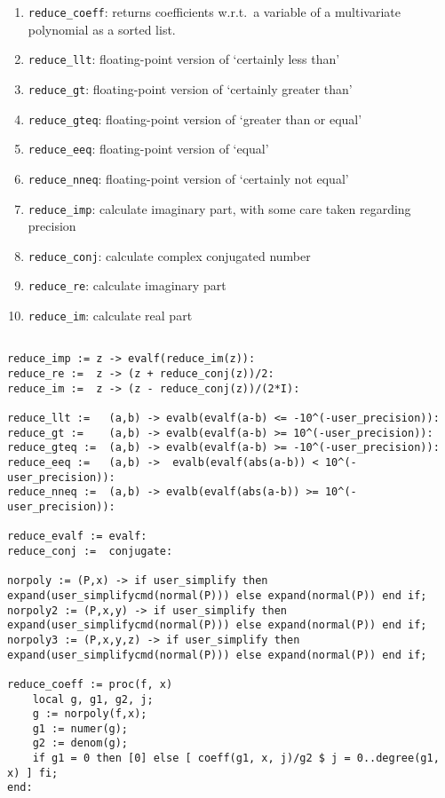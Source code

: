 \documentclass[a4paper,10pt]{article}
\begin{document}
\begin{enumerate}
\item   \verb+reduce_coeff+: returns coefficients w.r.t.~a variable of a multivariate polynomial as a sorted list.
\item   \verb+reduce_llt+: floating-point version of `certainly less than'
\item   \verb+reduce_gt+: floating-point version of `certainly greater than'
\item   \verb+reduce_gteq+: floating-point version of `greater than or equal'
\item   \verb+reduce_eeq+: floating-point version of `equal'
\item   \verb+reduce_nneq+: floating-point version of `certainly not equal'
\item   \verb+reduce_imp+: calculate imaginary part, with some care taken regarding precision
\item   \verb+reduce_conj+: calculate complex conjugated number
\item   \verb+reduce_re+: calculate imaginary part
\item   \verb+reduce_im+: calculate real part
\end{enumerate}

\begin{lstlisting}[name=tools]

reduce_imp := z -> evalf(reduce_im(z)):
reduce_re :=  z -> (z + reduce_conj(z))/2:
reduce_im :=  z -> (z - reduce_conj(z))/(2*I):

reduce_llt :=   (a,b) -> evalb(evalf(a-b) <= -10^(-user_precision)):
reduce_gt :=    (a,b) -> evalb(evalf(a-b) >= 10^(-user_precision)):
reduce_gteq :=  (a,b) -> evalb(evalf(a-b) >= -10^(-user_precision)):
reduce_eeq :=   (a,b) ->  evalb(evalf(abs(a-b)) < 10^(-user_precision)):
reduce_nneq :=  (a,b) -> evalb(evalf(abs(a-b)) >= 10^(-user_precision)):

reduce_evalf := evalf:
reduce_conj :=  conjugate:

norpoly := (P,x) -> if user_simplify then expand(user_simplifycmd(normal(P))) else expand(normal(P)) end if;
norpoly2 := (P,x,y) -> if user_simplify then expand(user_simplifycmd(normal(P))) else expand(normal(P)) end if;
norpoly3 := (P,x,y,z) -> if user_simplify then expand(user_simplifycmd(normal(P))) else expand(normal(P)) end if;

reduce_coeff := proc(f, x)
    local g, g1, g2, j;
    g := norpoly(f,x);
    g1 := numer(g);
    g2 := denom(g);
    if g1 = 0 then [0] else [ coeff(g1, x, j)/g2 $ j = 0..degree(g1, x) ] fi;
end:
\end{lstlisting}
\end{document}
